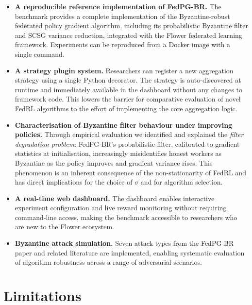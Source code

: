\begin{itemize}
    \item \textbf{A reproducible reference implementation of FedPG-BR.} The
          benchmark provides a complete implementation of the Byzantine-robust
          federated policy gradient algorithm, including its probabilistic Byzantine
          filter and SCSG variance reduction, integrated with the Flower federated
          learning framework. Experiments can be reproduced from a Docker image
          with a single command.

    \item \textbf{A strategy plugin system.} Researchers can register a new
          aggregation strategy using a single Python decorator. The strategy is
          auto-discovered at runtime and immediately available in the dashboard
          without any changes to framework code. This lowers the barrier for
          comparative evaluation of novel FedRL algorithms to the effort of
          implementing the core aggregation logic.

    \item \textbf{Characterisation of Byzantine filter behaviour under improving
          policies.} Through empirical evaluation we identified and explained the
          \emph{filter degradation problem}: FedPG-BR's probabilistic filter,
          calibrated to gradient statistics at initialisation, increasingly
          misidentifies honest workers as Byzantine as the policy improves and
          gradient variance rises. This phenomenon is an inherent consequence of
          the non-stationarity of FedRL and has direct implications for the choice
          of $\sigma$ and for algorithm selection.

    \item \textbf{A real-time web dashboard.} The dashboard enables interactive
          experiment configuration and live reward monitoring without requiring
          command-line access, making the benchmark accessible to researchers
          who are new to the Flower ecosystem.

    \item \textbf{Byzantine attack simulation.} Seven attack types from the
          FedPG-BR paper and related literature are implemented, enabling
          systematic evaluation of algorithm robustness across a range of adversarial
          scenarios.
\end{itemize}

\section*{Limitations}

